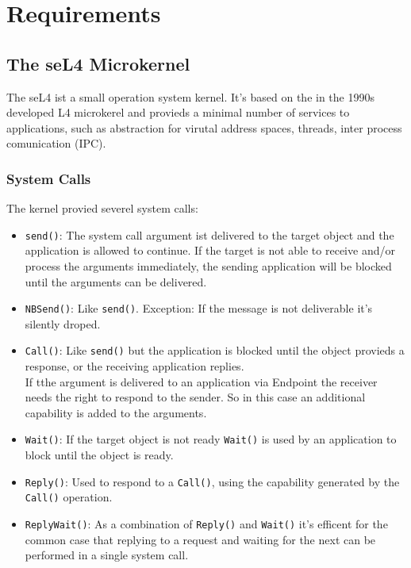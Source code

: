 \documentclass[pdftex,12pt,a4paper]{article}
\begin{document}
	
	\clearpage
	
	\section{Requirements}
	\subsection{The seL4 Microkernel}
	The seL4 \citep{sel4} ist a small operation system kernel. It's based on the in the 1990s developed L4 microkerel and provieds a minimal number of services to applications, such as abstraction for virutal address spaces, threads, inter process comunication (IPC). 
	
	\subsubsection{System Calls}
	The kernel provied severel system calls: \\
	\begin{itemize}
	\item \texttt{send()}: The system call argument ist delivered to the target object and the application is allowed to continue. If the target is not able to receive and/or process the arguments immediately, the sending application will be blocked until the arguments can be delivered.
	\item \texttt{NBSend()}: Like \texttt{send()}. Exception: If the message is not deliverable it's silently droped.
	\item \texttt{Call()}: Like \texttt{send()} but the application is blocked until the object provieds a response, or the receiving application replies. \\
	If tthe argument is delivered to an application via Endpoint the receiver needs the right to respond to the sender. So in this case an additional capability is added to the arguments. 
	\item \texttt{Wait()}: If the target object is not ready \texttt{Wait()} is used by an application to block until the object is ready. 
	\item \texttt{Reply()}: Used to respond to a \texttt{Call()}, using the capability generated by the \texttt{Call()} operation.
	\item \texttt{ReplyWait()}: As a combination of \texttt{Reply()} and \texttt{Wait()} it's efficent for the common case that replying to a request and waiting for the next can be performed in a single system call. 
	\end{itemize}
	\newpage
\end{document}
